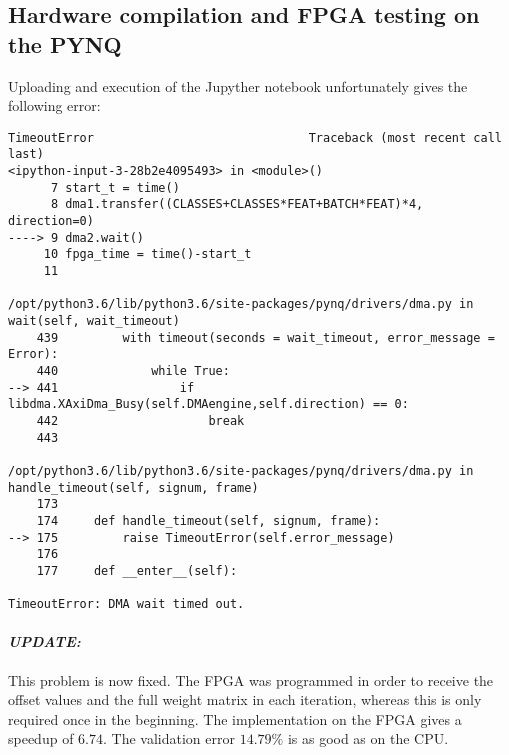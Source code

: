 \documentclass[../main.tex]{subfiles}
\begin{document}
	\subsection{Hardware compilation and FPGA testing on the PYNQ}
	Uploading and execution of the Jupyther notebook unfortunately gives the following error:
	\begin{lstlisting}[basicstyle=\tiny]
	TimeoutError                              Traceback (most recent call last)
<ipython-input-3-28b2e4095493> in <module>()
      7 start_t = time()
      8 dma1.transfer((CLASSES+CLASSES*FEAT+BATCH*FEAT)*4, direction=0)
----> 9 dma2.wait()
     10 fpga_time = time()-start_t
     11

/opt/python3.6/lib/python3.6/site-packages/pynq/drivers/dma.py in wait(self, wait_timeout)
    439         with timeout(seconds = wait_timeout, error_message = Error):
    440             while True:
--> 441                 if libdma.XAxiDma_Busy(self.DMAengine,self.direction) == 0:
    442                     break
    443

/opt/python3.6/lib/python3.6/site-packages/pynq/drivers/dma.py in handle_timeout(self, signum, frame)
    173
    174     def handle_timeout(self, signum, frame):
--> 175         raise TimeoutError(self.error_message)
    176
    177     def __enter__(self):

TimeoutError: DMA wait timed out.
	\end{lstlisting}

	\paragraph{\textit{UPDATE: }} This problem is now fixed. The FPGA was programmed in order to receive the offset values and the full weight matrix in each iteration, whereas this is only required once in the beginning. 
	The implementation on the FPGA gives a speedup of $6.74$. The validation error $14.79\%$ is as good as on the CPU.
\end{document}
